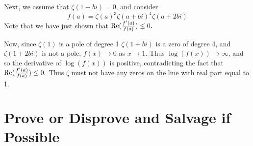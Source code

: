\documentclass{homework}
\begin{document}
\begin{solution}
                                                                                                                                Next, we assume that $\zeta(1 + bi) = 0$, and consider 
                                                                                                                                \[
                                                                                                                                f(a) = \zeta(a)^3\zeta(a+bi)^4 \zeta(a+2bi)
                                                                                                                                \]
                                                                                                                                Note that we have just shown that $\operatorname{Re}(\frac{f'(a)}{f(a)}) \leq 0.$ 

                                                                                                                                Now, since $\zeta(1)$ is a pole of degree 1 $\zeta(1+bi)$ is a zero of degree 4, and $\zeta(1+2bi)$ is not a pole, $f(x)\to 0$ as $x\to 1$. Thus $\log(f(x))\to \infty$, and so the derivative of $\log(f(x))$ is positive, contradicting the fact that $\operatorname{Re}(\frac{f'(a)}{f(a)}) \leq 0.$ Thus $\zeta$ must not have any zeros on the line with real part equal to 1.
                                                                                                                                \end{solution}
                                                                                                                                \section{Prove or Disprove and Salvage if Possible}
\end{document}
